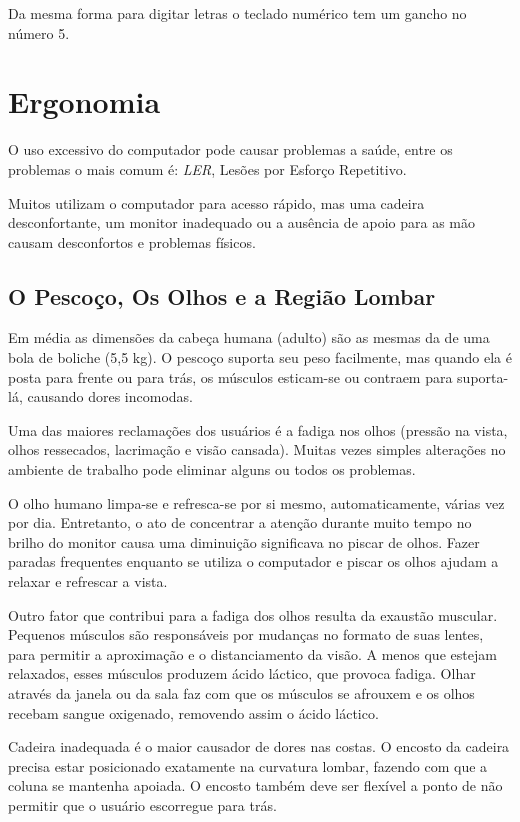 \documentclass[12pt,a4]{book}
\begin{document}
Da mesma forma para digitar letras o teclado numérico tem um gancho no número 5.

\section{Ergonomia}

O uso excessivo do computador pode causar problemas a saúde, entre os problemas
o mais comum é: \emph{LER}, Lesões por Esforço Repetitivo.

Muitos utilizam o computador para acesso rápido, mas uma cadeira
desconfortante, um monitor inadequado ou a ausência de apoio para as mão causam
desconfortos e problemas físicos.

\subsection{O Pescoço, Os Olhos e a Região Lombar}

Em média as dimensões da cabeça humana (adulto) são as mesmas da de uma bola de
boliche (5,5 kg). O pescoço suporta seu peso facilmente, mas quando ela é posta
para frente ou para trás, os músculos esticam-se ou contraem para suporta-lá,
causando dores incomodas.

Uma das maiores reclamações dos usuários é a fadiga nos olhos (pressão na
vista, olhos ressecados, lacrimação e visão cansada). Muitas vezes simples
alterações no ambiente de trabalho pode eliminar alguns ou todos os problemas.

O olho humano limpa-se e refresca-se por si mesmo, automaticamente, várias vez
por dia. Entretanto, o ato de concentrar a atenção durante muito tempo no
brilho do monitor causa uma diminuição significava no piscar de olhos. Fazer
paradas frequentes enquanto se utiliza o computador e piscar os olhos ajudam a
relaxar e refrescar a vista.

Outro fator que contribui para a fadiga dos olhos resulta da exaustão muscular.
Pequenos músculos são responsáveis por mudanças no formato de suas lentes, para
permitir a aproximação e o distanciamento da visão. A menos que estejam
relaxados, esses músculos produzem ácido láctico, que provoca fadiga. Olhar
através da janela ou da sala faz com que os músculos se afrouxem e os olhos
recebam sangue oxigenado, removendo assim o ácido láctico.

Cadeira inadequada é o maior causador de dores nas costas. O encosto da cadeira
precisa estar posicionado exatamente na curvatura lombar, fazendo com que a
coluna se mantenha apoiada. O encosto também deve ser flexível a ponto de não
permitir que o usuário escorregue para trás.
\end{document}
